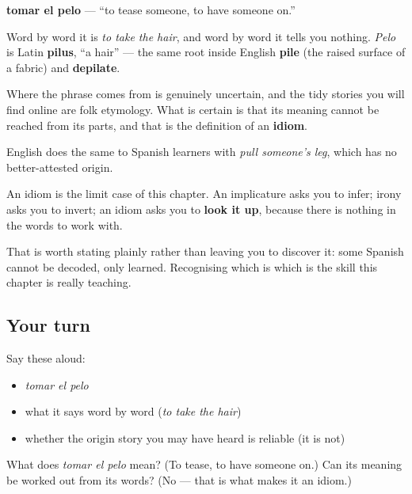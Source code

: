 \begin{cousinweb}
\textbf{tomar el pelo} — \textquotedblleft{}to tease someone, to have someone on.\textquotedblright{}

Word by word it is \emph{to take the hair}, and word by word it tells you nothing. \emph{Pelo} is Latin \textbf{pilus}, \textquotedblleft{}a hair\textquotedblright{} — the same root inside English \textbf{pile} (the raised surface of a fabric) and \textbf{depilate}.

Where the phrase comes from is genuinely uncertain, and the tidy stories you will find online are folk etymology. What is certain is that its meaning cannot be reached from its parts, and that is the definition of an \textbf{idiom}.

English does the same to Spanish learners with \emph{pull someone's leg}, which has no better-attested origin.
\end{cousinweb}

\begin{grammarlens}[title={What you've built}]
An idiom is the limit case of this chapter. An implicature asks you to infer; irony asks you to invert; an idiom asks you to \textbf{look it up}, because there is nothing in the words to work with.

That is worth stating plainly rather than leaving you to discover it: some Spanish cannot be decoded, only learned. Recognising which is which is the skill this chapter is really teaching.
\end{grammarlens}

\subsection*{Your turn}
Say these aloud:

\begin{itemize}
\raggedright
  \item \emph{tomar el pelo}
  \item what it says word by word (\emph{to take the hair})
  \item whether the origin story you may have heard is reliable (it is not)
\end{itemize}

\begin{tcolorbox}[breakable,colback=teal!4,colframe=teal!35!black,title={Before you move on}]
What does \emph{tomar el pelo} mean? (To tease, to have someone on.) Can its meaning be worked out from its words? (No — that is what makes it an idiom.)
\end{tcolorbox}
